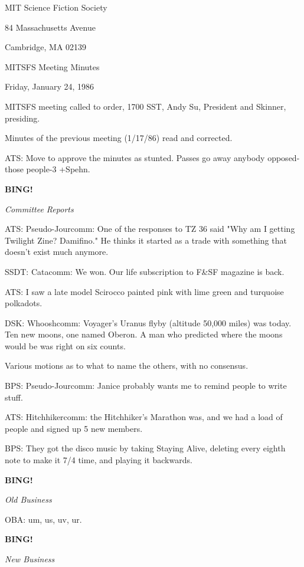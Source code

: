 \documentclass[12pt]{article}
\newcommand{\bing}{{\bf BING!} }
\newcommand{\goto}[1]{\bing \vskip 12pt \centerline{{\em{#1}}}}
\begin{document}
\begin{center}

MIT Science Fiction Society 

84 Massachusetts Avenue

Cambridge, MA 02139

\vspace{12pt}

MITSFS Meeting Minutes 

Friday, January 24, 1986

\end{center}
 
\vspace{18pt}

\setlength{\parskip}{6pt}

\noindent
MITSFS meeting called to order, 1700 SST,
Andy Su, President and Skinner, presiding.

Minutes of the previous meeting (1/17/86) read and corrected.

ATS: Move to approve the minutes as stunted. Passes go away anybody opposed-those people-3 +Spehn.

\goto{Committee Reports}

ATS: Pseudo-Jourcomm: One of the responses to TZ 36 said "Why am I getting Twilight Zine? Damifino." He thinks it started as a trade with something that doesn't exist much anymore.

SSDT: Catacomm: We won. Our life subscription to F&SF magazine is back.

ATS: I saw a late model Scirocco painted pink with lime green and turquoise polkadots.

DSK: Whooshcomm: Voyager's Uranus flyby (altitude 50,000 miles) was today. Ten new moons, one named Oberon. A man who predicted where the moons would be was right on six counts.

Various motions as to what to name the others, with no consensus.

BPS: Pseudo-Jourcomm: Janice probably wants me to remind people to write stuff.

ATS: Hitchhikercomm: the Hitchhiker's Marathon was, and we had a load of people and signed up 5 new members.

BPS: They got the disco music by taking Staying Alive, deleting every eighth note to make it 7/4 time, and playing it backwards.

\goto{Old Business}

OBA: um, us, uv, ur.

\goto{New Business}
\end{document}
